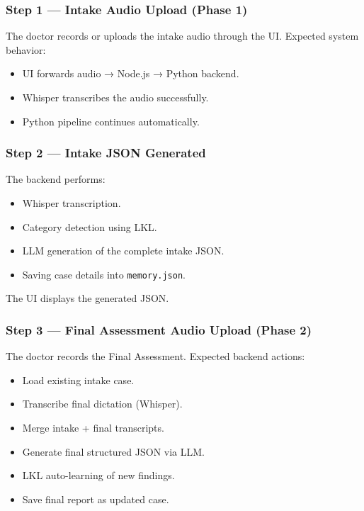 \subsubsection*{Step 1 — Intake Audio Upload (Phase 1)}

The doctor records or uploads the intake audio through the UI.  
Expected system behavior:

\begin{itemize}
    \item UI forwards audio → Node.js → Python backend.
    \item Whisper transcribes the audio successfully.
    \item Python pipeline continues automatically.
\end{itemize}


\subsubsection*{Step 2 — Intake JSON Generated}

The backend performs:

\begin{itemize}
    \item Whisper transcription.
    \item Category detection using LKL.
    \item LLM generation of the complete intake JSON.
    \item Saving case details into \texttt{memory.json}.
\end{itemize}

The UI displays the generated JSON.



\subsubsection*{Step 3 — Final Assessment Audio Upload (Phase 2)}

The doctor records the Final Assessment.  
Expected backend actions:

\begin{itemize}
    \item Load existing intake case.
    \item Transcribe final dictation (Whisper).
    \item Merge intake + final transcripts.
    \item Generate final structured JSON via LLM.
    \item LKL auto-learning of new findings.
    \item Save final report as updated case.
\end{itemize}



